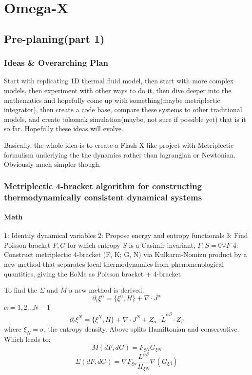 \chapter{Omega-X}
\section{Pre-planing(part 1)}
\subsection{Ideas \& Overarching Plan}
\par Start with replicating 1D thermal fluid model, then start with more complex models, then experiment with other ways to do it, then dive deeper into the mathematics and hopefully come up with something(maybe metriplectic integrator), then create a code base, compare these systems to other traditional models, and create tokomak simulation(maybe, not sure if possible yet) that is it so far. Hopefully these ideas will evolve. 

Basically, the whole idea is to create a Flash-X like project with Metriplectic formulism underlying the the dynamics rather than lagrangian or Newtonian. Obviously much simpler though.

\subsection{Metriplectic 4-bracket algorithm for constructing thermodynamically consistent
 dynamical systems}
\subsubsection{Math}
1: Identify dynamical variables
2: Propose energy and entropy functionals
3: Find Poisson bracket ${F, G}$ for which entropy $S$ is a Casimir invariant, ${F, S} = 0 \forall F$
4: Construct metriplectic 4-bracket (F, K; G, N) via Kulkarni-Nomizu product by a new method that separates local thermodynamics from phenomenological quantities, giving the EoMs as Poisson bracket + 4-bracket

To find the $\Sigma$ and $M$ a new method is derived. 
$$\partial_t \xi^\alpha= \{\xi^\alpha , H\} + \nabla \cdot J^\alpha$$
$\alpha = 1, 2... N-1$
$$\partial_t \xi^N= \{\xi^N , H\} + \nabla \cdot J^N+Z_\alpha \cdot \tilde{L}^{\alpha \beta} \cdot Z_\beta$$
where $\xi_N = \sigma$, the entropy density. Above splits Hamiltonian and conservative.
Which leads to:
$$M(dF, dG)=F_{\xi N}G_{\xi N}$$
$$\Sigma(dF, dG)=\nabla F_{\xi \alpha }\frac{L^{\alpha \beta}}{H_{\xi N}}\nabla (G_{\xi \beta})$$
